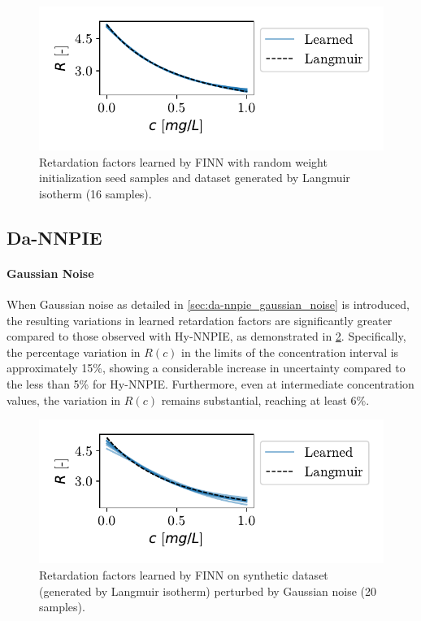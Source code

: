 \begin{figure}[h]
    \centering
    \includegraphics{figs/finn_synthetic_SPAN_seed.pdf}
    \caption{Retardation factors learned by FINN with random weight initialization seed samples and dataset generated by Langmuir isotherm (16 samples).}
    \label{fig:synthetic_SPAN_seed}
\end{figure}



\subsection{Da-NNPIE}
\paragraph{Gaussian Noise}
When Gaussian noise as detailed in \cref{sec:da-nnpie_gaussian_noise} is introduced, the resulting variations in learned retardation factors are significantly greater compared to those observed with Hy-NNPIE, as demonstrated in \cref{fig:synthetic_SPAN_noise}.
Specifically, the percentage variation in $R(c)$ in the limits of the concentration interval is approximately 15\%, showing a considerable increase in uncertainty compared to the less than 5\% for Hy-NNPIE. Furthermore, even at intermediate concentration values, the variation in $R(c)$ remains substantial, reaching at least 6\%.

\begin{figure}[h]
    \centering
    \includegraphics{figs/finn_synthetic_SPAN_noise.pdf}
    \caption{Retardation factors learned by FINN on synthetic dataset (generated by Langmuir isotherm) perturbed by Gaussian noise (20 samples).}
    \label{fig:synthetic_SPAN_noise}
\end{figure}

